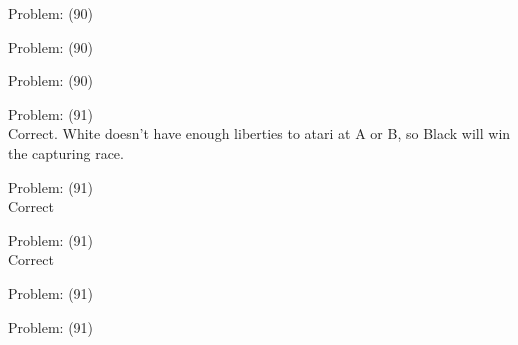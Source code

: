 \documentclass[11pt]{article}
\begin{document}
\begin{minipage}[t]{0.5\textwidth}
  {\centering
  
Problem: (90)\\
  }
\end{minipage}
\begin{minipage}[t]{0.5\textwidth}
  {\centering
  
Problem: (90)\\
  }
\end{minipage}
\begin{minipage}[t]{0.5\textwidth}
  {\centering
  
Problem: (90)\\
  }
\end{minipage}
\begin{minipage}[t]{0.5\textwidth}
  {\centering
  
Problem: (91)\\
Correct. White doesn't have enough liberties to atari at A or B, so Black will win the capturing race.\\
  }
\end{minipage}
\begin{minipage}[t]{0.5\textwidth}
  {\centering
  
Problem: (91)\\
Correct\\
  }
\end{minipage}
\begin{minipage}[t]{0.5\textwidth}
  {\centering
  
Problem: (91)\\
Correct\\
  }
\end{minipage}
\begin{minipage}[t]{0.5\textwidth}
  {\centering
  
Problem: (91)\\
  }
\end{minipage}
\begin{minipage}[t]{0.5\textwidth}
  {\centering
  
Problem: (91)\\
  }
\end{minipage}
\end{document}
